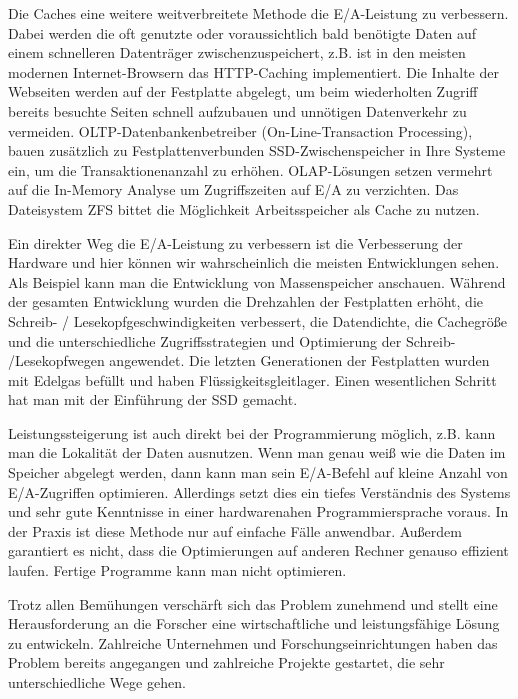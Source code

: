 Die Caches eine weitere weitverbreitete Methode die E/A-Leistung zu verbessern. Dabei werden die oft genutzte oder voraussichtlich bald benötigte Daten auf einem schnelleren Datenträger zwischenzuspeichert, z.B. ist in den meisten modernen Internet-Browsern das HTTP-Caching implementiert. Die Inhalte der Webseiten werden auf der Festplatte abgelegt, um beim wiederholten Zugriff bereits besuchte Seiten schnell aufzubauen und unnötigen Datenverkehr zu vermeiden. 
OLTP-Datenbankenbetreiber (On-Line-Transaction Processing), bauen zusätzlich zu Festplattenverbunden SSD-Zwischenspeicher in Ihre Systeme ein, um die Transaktionenanzahl zu erhöhen. 
OLAP-Lösungen setzen vermehrt auf die In-Memory Analyse um Zugriffszeiten auf E/A zu verzichten.
Das Dateisystem ZFS bittet die Möglichkeit Arbeitsspeicher als Cache zu nutzen. 

Ein direkter Weg die E/A-Leistung zu verbessern ist die Verbesserung der Hardware und hier können wir wahrscheinlich die meisten Entwicklungen sehen. Als Beispiel kann man die Entwicklung von Massenspeicher anschauen. Während der gesamten Entwicklung wurden die Drehzahlen der Festplatten erhöht, die Schreib- / Lesekopfgeschwindigkeiten verbessert, die Datendichte, die Cachegröße und die unterschiedliche Zugriffsstrategien und Optimierung der Schreib- /Lesekopfwegen angewendet. Die letzten Generationen der Festplatten wurden mit Edelgas befüllt und haben Flüssigkeitsgleitlager. Einen wesentlichen Schritt hat man mit der Einführung der SSD gemacht. 


Leistungssteigerung ist auch direkt bei der Programmierung möglich, z.B. kann man die Lokalität der Daten ausnutzen. Wenn man genau weiß wie die Daten im Speicher abgelegt werden, dann kann man sein E/A-Befehl auf kleine Anzahl von E/A-Zugriffen optimieren. Allerdings setzt dies ein tiefes Verständnis des Systems und sehr gute Kenntnisse in einer hardwarenahen Programmiersprache voraus. In der Praxis ist diese Methode nur auf einfache Fälle anwendbar. Außerdem garantiert es nicht, dass die Optimierungen auf anderen Rechner genauso effizient laufen. Fertige Programme kann man nicht optimieren.

Trotz allen Bemühungen verschärft sich das Problem zunehmend und stellt eine Herausforderung an die Forscher eine wirtschaftliche und leistungsfähige Lösung zu entwickeln. Zahlreiche Unternehmen und Forschungseinrichtungen haben das Problem bereits angegangen und zahlreiche Projekte gestartet, die sehr unterschiedliche Wege gehen.

